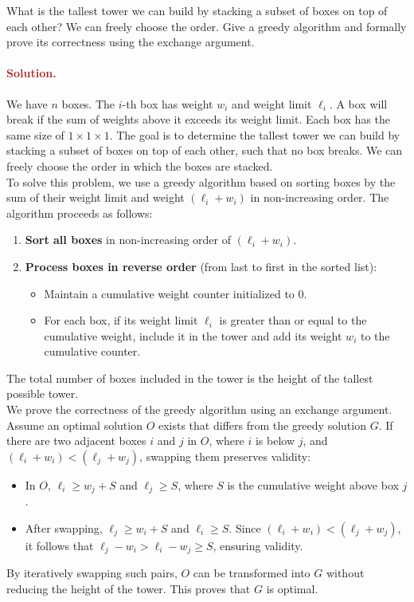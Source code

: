 What is the tallest tower we can build by stacking a subset of boxes on top of each other? We can freely choose the order. Give a greedy algorithm and formally prove its correctness using the exchange argument.

\paragraph{\textcolor{brown}{Solution.}}
We have $n$ boxes. The $i$-th box has weight $w_i$ and weight limit $\ell_i$. A box will break if the sum of weights above it exceeds its weight limit. Each box has the same size of $1 \times 1 \times 1$. The goal is to determine the tallest tower we can build by stacking a subset of boxes on top of each other, such that no box breaks. We can freely choose the order in which the boxes are stacked.\\
To solve this problem, we use a greedy algorithm based on sorting boxes by the sum of their weight limit and weight $(\ell_i + w_i)$ in non-increasing order. The algorithm proceeds as follows: \begin{enumerate} \item \textbf{Sort all boxes} in non-increasing order of $(\ell_i + w_i)$. \item \textbf{Process boxes in reverse order} (from last to first in the sorted list): \begin{itemize} \item Maintain a cumulative weight counter initialized to $0$. \item For each box, if its weight limit $\ell_i$ is greater than or equal to the cumulative weight, include it in the tower and add its weight $w_i$ to the cumulative counter. \end{itemize} \end{enumerate} The total number of boxes included in the tower is the height of the tallest possible tower. \\
We prove the correctness of the greedy algorithm using an exchange argument. Assume an optimal solution $O$ exists that differs from the greedy solution $G$. If there are two adjacent boxes $i$ and $j$ in $O$, where $i$ is below $j$, and $(\ell_i + w_i) < (\ell_j + w_j)$, swapping them preserves validity: \begin{itemize} \item In $O$, $\ell_i \geq w_j + S$ and $\ell_j \geq S$, where $S$ is the cumulative weight above box $j$. \item After swapping, $\ell_j \geq w_i + S$ and $\ell_i \geq S$. Since $(\ell_i + w_i) < (\ell_j + w_j)$, it follows that $\ell_j - w_i > \ell_i - w_j \geq S$, ensuring validity. \end{itemize} By iteratively swapping such pairs, $O$ can be transformed into $G$ without reducing the height of the tower. This proves that $G$ is optimal.



